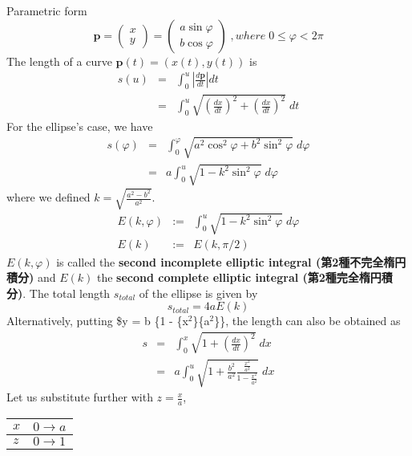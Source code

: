 \documentclass{article}
\begin{document}
Parametric form
\begin{equation}
\mathbf{p} =\left(
\begin{array}{c}
 x \\
 y
\end{array} \right)
=\left(
\begin{array}{c}
 a \sin{\varphi} \\
 b \cos{\varphi}
\end{array} \right)
\;, where \; 0 \le \varphi < 2 \pi
\end{equation}
The length of a curve $\mathbf{p}(t) = (x(t), y(t))$ is
\begin{eqnarray}
s(u) &=& \int_{0}^{u} \left| \frac{d \mathbf{p}}{d t} \right| dt  \\ \nonumber
     &=& \int_{0}^{u} \sqrt{ \left( \frac{d x}{d t} \right)^{2} +  \left( \frac{d x}{d t} \right)^{2} } \; dt
\end{eqnarray}
For the ellipse's case, we have
\begin{eqnarray}
s(\varphi) &=& \int_{0}^{\varphi} \sqrt{ a^{2} \cos^{2}{\varphi} +  b^{2}  \sin^{2}{\varphi}} \; d\varphi \\ \nonumber
     &=& a \int_{0}^{u} \sqrt{ 1 -  k^{2}  \sin^{2}{\varphi}} \; d\varphi 
\end{eqnarray}
where we defined $k = \sqrt{\frac{a^2 - b^2}{a^2}}$.
\begin{eqnarray}
E(k, \varphi ) &:=& \int_{0}^{u} \sqrt{ 1 -  k^{2}  \sin^{2}{\varphi}} \; d\varphi \\
E(k) &:=& E(k,  \pi/2 )
\end{eqnarray}
$E(k, \varphi )$ is called the \textbf{second incomplete elliptic integral (第2種不完全楕円積分)} and $E(k)$ the \textbf{second complete elliptic integral (第2種完全楕円積分)}. The total length $s_{total}$ of the ellipse is given by 
\begin{equation}
s_{total} = 4a E(k) 
\end{equation}
Alternatively, putting \$y = \textpm{} b \sqrt\{1 - \frac\{x$^{\text{2}}$\}\{a$^{\text{2}}$\}\}, the length can also be obtained as
\begin{eqnarray}
s &=& \int_{0}^{x} \sqrt{ 1  +  \left( \frac{d x}{d t} \right)^{2} } \; dx \\ \nonumber
     &=& a \int_{0}^{u} \sqrt{ 1  +   \frac{b^{2}}{a^{2}} \frac{\frac{x^{2}}{a^{2}}}{1 - \frac{x^{2}}{a^{2}}} } \; dx
\end{eqnarray}
Let us substitute further with $z = \frac{x}{a}$, 
\begin{center}
\begin{tabular}{ll}
$x$ & $0 \rightarrow a$\\
\hline
$z$ & $0 \rightarrow 1$\\
\end{tabular}
\end{center}
\end{document}

